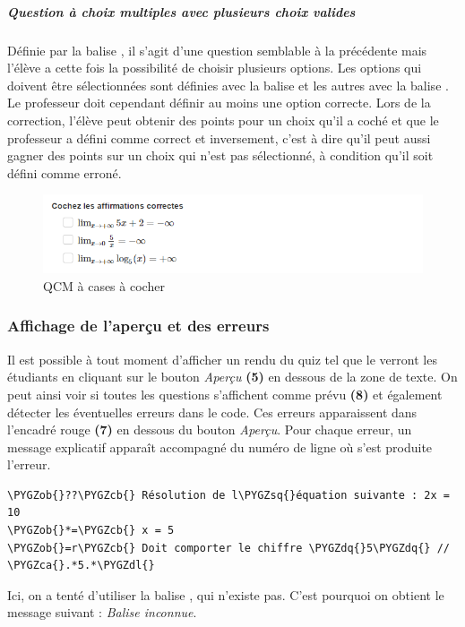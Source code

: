 \documentclass[a4,10pt,french]{sphinxmanual}
\def\PYGZob{\char`\{}
\def\PYGZcb{\char`\}}
\def\PYGZca{\char`\^}
\def\PYGZdl{\char`\$}
\def\PYGZsq{\char`\'}
\def\PYGZdq{\char`\"}
\renewcommand\PYGZsq{\textquotesingle}
\begin{document}
\subparagraph{Question à choix multiples avec plusieurs choix valides}
\label{doc-user:question-a-choix-multiples-avec-plusieurs-choix-valides}
Définie par la balise \code{\{++\}}, il s'agit d'une question semblable à la précédente mais l'élève a cette fois la possibilité de choisir plusieurs options. Les options qui doivent être sélectionnées sont définies avec la balise \code{\{=\}} et les autres avec la balise \code{\{*\}}. Le professeur doit cependant définir au moins une option correcte. Lors de la correction, l'élève peut obtenir des points pour un choix qu'il a coché et que le professeur a défini comme correct et inversement, c'est à dire qu'il peut aussi gagner des points sur un choix qui n'est pas sélectionné, à condition qu'il soit défini comme erroné.
\begin{figure}[htbp]
\centering
\capstart

\includegraphics[width=0.800\linewidth]{checkbox.png}
\caption{QCM à cases à cocher}\end{figure}


\subsubsection{Affichage de l'aperçu et des erreurs}
\label{doc-user:affichage-de-l-apercu-et-des-erreurs}
Il est possible à tout moment d'afficher un rendu du quiz tel que le verront les étudiants en cliquant sur le bouton \emph{Aperçu} \textbf{(5)} en dessous de la zone de
texte. On peut ainsi voir si toutes les questions s'affichent comme prévu \textbf{(8)} et également détecter les éventuelles erreurs dans le code. Ces erreurs
apparaissent dans l'encadré rouge \textbf{(7)} en dessous du bouton \emph{Aperçu}. Pour chaque erreur, un message explicatif apparaît accompagné du numéro de ligne où s'est
produite l'erreur.

\begin{Verbatim}[commandchars=\\\{\}]
\PYGZob{}??\PYGZcb{} Résolution de l\PYGZsq{}équation suivante : 2x = 10
\PYGZob{}*=\PYGZcb{} x = 5
\PYGZob{}=r\PYGZcb{} Doit comporter le chiffre \PYGZdq{}5\PYGZdq{} // \PYGZca{}.*5.*\PYGZdl{}
\end{Verbatim}

Ici, on a tenté d'utiliser la balise \code{\{*=\}}, qui n'existe pas. C'est pourquoi on obtient le message suivant : \emph{Balise inconnue}.
\end{document}
